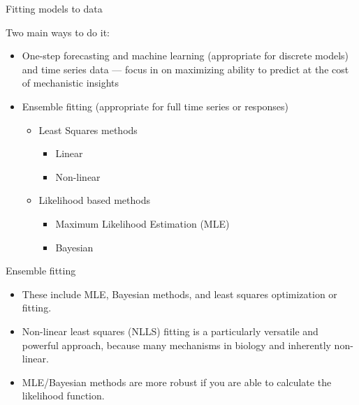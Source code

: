 \documentclass[xcolor=x11names,compress]{beamer}
\renewcommand{\(}{\begin{columns}}
\renewcommand{\)}{\end{columns}}
\newcommand{\<}[1]{\begin{column}{#1}}
\renewcommand{\>}{\end{column}}
\begin{document}
\begin{frame}{Fitting models to data}

Two main ways to do it:

\begin{itemize}\itemsep10pt

	\item One-step forecasting and machine learning (appropriate for discrete models) and time 
	series data --- focus in on maximizing ability to predict at the cost of mechanistic insights 

	\item Ensemble fitting (appropriate for full time series or responses)
	\begin{itemize}
	\item Least Squares methods
	\begin{itemize}
	 \item Linear 
	 \item Non-linear
	\end{itemize}
	\item Likelihood based methods 
	\begin{itemize}
	 \item Maximum Likelihood Estimation (MLE) 
	 \item Bayesian
	\end{itemize}

	\end{itemize}
	
\end{itemize}

\end{frame}

\begin{frame}{Ensemble fitting}

\begin{itemize} \itemsep12pt
	
\item These include MLE, Bayesian methods, and least squares optimization or fitting. 

\item Non-linear least squares (NLLS) fitting is a particularly versatile and powerful approach, because many mechanisms in biology and inherently non-linear.  

\item MLE/Bayesian methods are more robust if you are able to calculate the likelihood function.

\end{itemize}

\end{frame}
\end{document}
